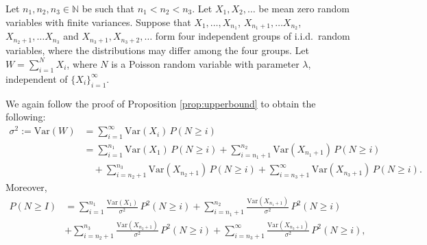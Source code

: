 \documentclass[pdflatex,sn-mathphys-ay]{sn-jnl}
\newcommand{\Var}{\mathrm{Var}}
\theoremstyle{thmstyleone}%
\theoremstyle{thmstyletwo}%
\theoremstyle{thmstylethree}%
\begin{document}

         Let $n_1, n_2, n_3\in \mathbb{N}$ be such that $n_1< n_2< n_3$. Let $X_1,X_2,\ldots$ be mean zero random variables with finite variances.
Suppose that
$X_1,\ldots,X_{n_1}$, $X_{n_1+1},\ldots X_{n_2}$, $X_{n_2+1},\ldots X_{n_3}$    and  $X_{n_3+1}, X_{n_3+2}, \ldots $ 
form four independent groups of i.i.d.\ random variables, where the distributions may differ among the four groups. Let $W=\sum_{i=1}^N X_i$, where $N$ is a Poisson random variable  with parameter $\lambda$, independent of $\{X_i\}_{i=1}^\infty$.


We again follow the proof of Proposition \ref{prop:upperbound} to obtain the following:
		\begin{align} \label{TH:AI1}
			\sigma^2 := \Var(W) &= \sum_{i=1}^\infty \Var(X_i) \, P(N \ge i) \nonumber\\
			&=  \sum_{i=1}^{n_{1}  } \Var(X_1)  \, P(N \ge i)+ \sum_{i={n_{1}+1}  }^{n_2}\Var(X_{n_{1} + 1})  \, P(N \ge i)\nonumber \\
			&\quad+  \sum_{i={n_2+1}}^{n_{3}  }\Var(X_{n_{2} + 1}) \, P(N \ge i)+  \sum_{i=n_{3}+1}^{\infty  }\Var(X_{n_{3} + 1})  \, P(N \ge i). 
		\end{align}
		Moreover,
		\begin{align} \label{TH:AI2}
				P(N \ge I) 
				&= \sum_{i=1}^{n_1}\frac{\Var(X_1)}{\sigma^2} \, {P}^2(N \ge i) +\sum_{i=n_1+1}^{n_2}\frac{\Var(X_{n_1+1})}{\sigma^2} \, {P}^2(N \ge i)\nonumber\\
                &+\sum_{i=n_2+1}^{n_3}\frac{\Var(X_{n_2+1})}{\sigma^2} \, {P}^2(N \ge i)+\sum_{i=n_3+1}^{\infty}\frac{\Var(X_{n_3+1})}{\sigma^2} \, {P}^2(N \ge i),
			\end{align} 
		
\end{document}
